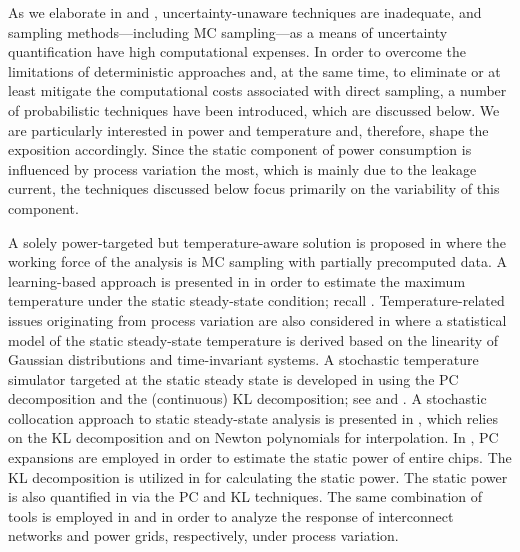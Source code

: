 As we elaborate in  and , uncertainty-unaware
techniques are inadequate, and sampling methods---including \ac{MC}
sampling---as a means of uncertainty quantification have high computational
expenses. In order to overcome the limitations of deterministic approaches and,
at the same time, to eliminate or at least mitigate the computational costs
associated with direct sampling, a number of probabilistic techniques have been
introduced, which are discussed below. We are particularly interested in power
and temperature and, therefore, shape the exposition accordingly. Since the
static component of power consumption is influenced by process variation the
most, which is mainly due to the leakage current, the techniques discussed below
focus primarily on the variability of this component.

A solely power-targeted but temperature-aware solution is proposed in
\cite{chandra2010} where the working force of the analysis is \ac{MC} sampling
with partially precomputed data. A learning-based approach is presented in
\cite{juan2011} in order to estimate the maximum temperature under the static
steady-state condition; recall .
Temperature-related issues originating from process variation are also
considered in \cite{juan2012} where a statistical model of the static
steady-state temperature is derived based on the linearity of Gaussian
distributions and time-invariant systems. A stochastic temperature simulator
targeted at the static steady state is developed in \cite{huang2009a} using the
\ac{PC} decomposition and the (continuous) \ac{KL} decomposition; see
 and . A stochastic
collocation \cite{maitre2010, xiu2010} approach to static steady-state analysis
is presented in \cite{lee2013}, which relies on the \ac{KL} decomposition and on
Newton polynomials for interpolation. In \cite{shen2009}, \ac{PC} expansions are
employed in order to estimate the static power of entire chips. The \ac{KL}
decomposition is utilized in \cite{bhardwaj2006} for calculating the static
power. The static power is also quantified in \cite{bhardwaj2008} via the
\ac{PC} and \ac{KL} techniques. The same combination of tools is employed in
\cite{vrudhula2006} and \cite{ghanta2006} in order to analyze the response of
interconnect networks and power grids, respectively, under process variation.

